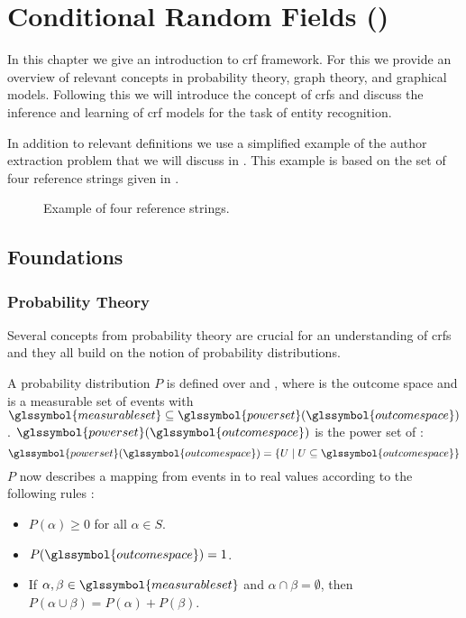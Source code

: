\chapter{Conditional Random Fields ()}\label{cha:crfs}

In this chapter we give an introduction to \acrfull{crf} framework.
For this we provide an overview of relevant concepts in probability theory, graph theory, and graphical models.
Following this we will introduce the concept of \glspl{crf} and discuss the inference and learning of \gls{crf} models for the task of entity recognition.

In addition to relevant definitions we use a simplified example of the author extraction problem that we will discuss in .
This example is based on the set of four reference strings given in .

\begin{figure}[t]
\begin{framed}
  
\end{framed}
\caption{Example of four reference strings.}
\label{fig:example-reference-strings}
\end{figure}
\section{Foundations}\label{sec:foundations}
\subsection{Probability Theory}\label{subsec:probability-theory}
Several concepts from probability theory are crucial for an understanding of \glspl{crf} and they all build on the notion of \glspl{probability distribution}.

A \gls{probability distribution} $P$ is defined over  and , where  is the \gls{outcome space} and  is a \gls{measurable set} of \glspl{event} with $\glssymbol{measurable set}\subseteq \glssymbol{power set} (\glssymbol{outcome space})$ \citep{koller2009probabilistic}.
$\glssymbol{power set}(\glssymbol{outcome space})$ is the \gls{power set} of :
\begin{equation}
  \label{equ:power-set}
  \glssymbol{power set}(\glssymbol{outcome space})=\left\{U\mid U\subseteq \glssymbol{outcome space}\right\}
\end{equation}
$P$ now describes a mapping from events in  to real values according to the following rules \citep{koller2009probabilistic}:
\begin{itemize}
  \item $P(\alpha)\geq 0 $ for all $ \alpha \in S$.
  \item $P(\glssymbol{outcome space})=1$.
  \item If $\alpha,\beta\in \glssymbol{measurable set}$ and $\alpha\cap\beta = \emptyset$, then $P(\alpha\cup\beta)=P(\alpha)+P(\beta)$.
\end{itemize}

